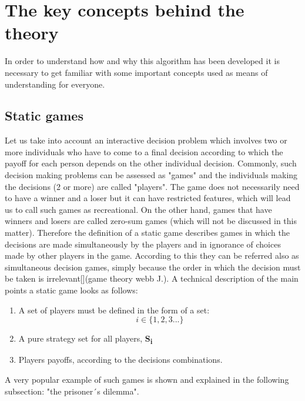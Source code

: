 \documentclass[conference]{IEEEtran}
\begin{document}
\section{The key concepts behind the theory}
In order to understand how and why this algorithm has been developed it is necessary to get familiar with some important concepts used as means of understanding for everyone.
\subsection{Static games}
Let us take into account an interactive decision problem which involves two or more individuals who have to come to a final decision according to which the payoff for each person depends on the other individual decision. Commonly, such decision making problems can be assessed as "games" and the individuals making the decisions (2 or more) are called "players". The game does not necessarily need to have a winner and a loser but it can have restricted features, which will lead us to call such games as recreational. On the other hand, games
that have winners and losers are called zero-sum games (which will not be discussed in this matter). 
Therefore the definition of a static game describes games in which the decisions are made simultaneously by the players and in ignorance of choices made by other players in the game. According to this they can be referred also as simultaneous decision games, simply because the order in which the decision must be taken is irrelevant[](game theory webb J.). A technical description of the main points a static game looks as follows:
\begin{enumerate}
  \item A set of players must be defined in the form of a set: \[i\in       \{1,2,3...\}\]
  \item A pure strategy set for all players, \textbf{S{\textsubscript{i}}}
  \item Players payoffs, according to the decisions combinations.
\end{enumerate} 
A very popular example of such games is shown and explained in the following subsection: "the prisoner´s dilemma".
\end{document}
